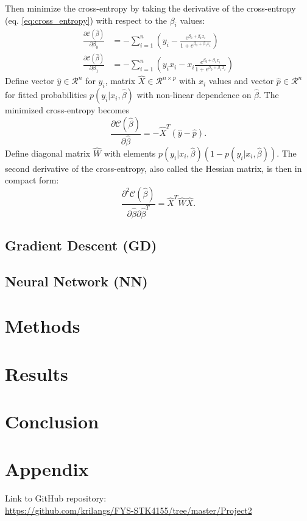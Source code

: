 \documentclass[12pt,a4paper,english]{article}
\begin{document}
Then minimize the cross-entropy by taking the derivative of the cross-entropy (eq. \ref{eq:cross_entropy}) with respect to the $\beta_i$ values:
\begin{align*}
\frac{\partial \mathcal{C}(\hat{\beta})}{\partial \beta_0}&=-\sum_{i=1}^{n}\left(y_i-\frac{e^{\beta_0+\beta_1x_i}}{1+e^{\beta_0+\beta_1x_i}}\right)\\
\frac{\partial \mathcal{C}(\hat{\beta})}{\partial \beta_1}&=-\sum_{i=1}^{n}\left(y_ix_i-x_i\frac{e^{\beta_0+\beta_1x_i}}{1+e^{\beta_0+\beta_1x_i}}\right)
\end{align*}
Define vector $\hat{y}\in\mathcal{R}^n$ for $y_i$, matrix $\hat{X}\in\mathcal{R}^{n\times p}$ with $x_i$ values and vector $\hat{p}\in\mathcal{R}^n$ for fitted probabilities $p(y_i|x_i,\hat{\beta})$ with non-linear dependence on $\hat{\beta}$. The minimized cross-entropy becomes
\begin{equation}
\label{eq:min_cross_entropy}
\frac{\partial \mathcal{C}(\hat{\beta})}{\partial \hat{\beta}}=-\hat{X}^T(\hat{y}-\hat{p}).
\end{equation}
Define diagonal matrix $\hat{W}$ with elements $p(y_i|x_i,\hat{\beta})(1-p(y_i|x_i,\hat{\beta}))$. The second derivative of the cross-entropy, also called the Hessian matrix, is then in compact form:
\begin{equation}
\label{eq:Hessian}
\frac{\partial^2 \mathcal{C}(\hat{\beta})}{\partial \hat{\beta}\partial \hat{\beta}^T}=\hat{X}^T\hat{W}\hat{X}.
\end{equation}

\subsection{Gradient Descent (GD)}
\subsection{Neural Network (NN)}

\section{Methods}
\section{Results}
\section{Conclusion}
\appendix
\section{Appendix}
\label{sect:appendix}
Link to GitHub repository:\\
\url{https://github.com/krilangs/FYS-STK4155/tree/master/Project2}



\end{document}
